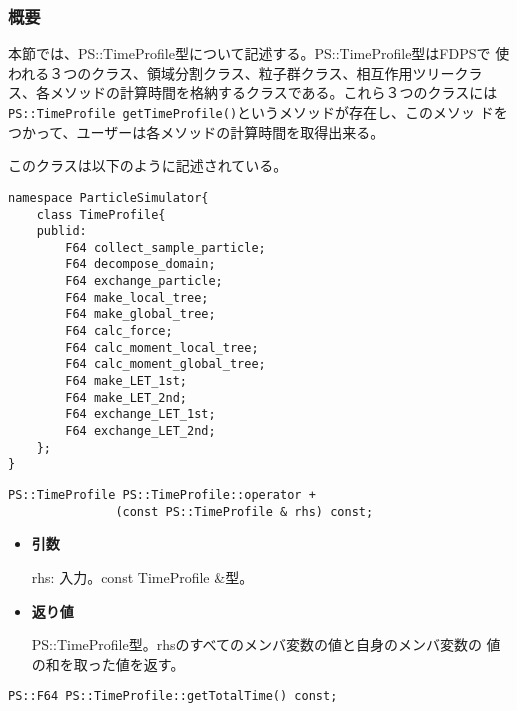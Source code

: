 \subsubsection{概要}

本節では、PS::TimeProfile型について記述する。PS::TimeProfile型はFDPSで
使われる３つのクラス、領域分割クラス、粒子群クラス、相互作用ツリークラ
ス、各メソッドの計算時間を格納するクラスである。これら３つのクラスには
{\tt PS::TimeProfile getTimeProfile()}というメソッドが存在し、このメソッ
ドをつかって、ユーザーは各メソッドの計算時間を取得出来る。

このクラスは以下のように記述されている。

\begin{lstlisting}[caption=TimeProfile]
namespace ParticleSimulator{
    class TimeProfile{
    publid:
        F64 collect_sample_particle;
        F64 decompose_domain;
        F64 exchange_particle;
        F64 make_local_tree;
        F64 make_global_tree;
        F64 calc_force;
        F64 calc_moment_local_tree;
        F64 calc_moment_global_tree;
        F64 make_LET_1st;
        F64 make_LET_2nd;        
        F64 exchange_LET_1st;
        F64 exchange_LET_2nd;
    };
}    
\end{lstlisting}

\mbox{}

\begin{screen}
\begin{verbatim}
PS::TimeProfile PS::TimeProfile::operator + 
               (const PS::TimeProfile & rhs) const;
\end{verbatim}
\end{screen}

\begin{itemize}

\item{{\bf 引数}}

{rhs}: 入力。{const TimeProfile \&}型。

\item{{\bf 返り値}}

{PS::TimeProfile}型。{rhs}のすべてのメンバ変数の値と自身のメンバ変数の
値の和を取った値を返す。

\end{itemize}

\mbox{}

\begin{screen}
\begin{verbatim}
PS::F64 PS::TimeProfile::getTotalTime() const;
\end{verbatim}
\end{screen}

